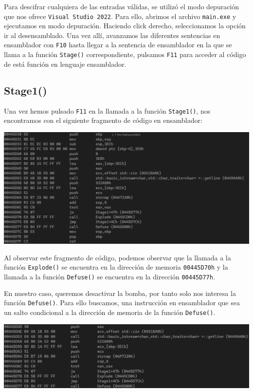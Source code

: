 \documentclass[11pt,a4paper]{article}
\begin{document}
Para descifrar cualquiera de las entradas válidas, se utilizó el 
modo depuración que nos ofrece \texttt{Visual Studio 2022}. Para ello, abrimos el 
archivo \texttt{main.exe} y ejecutamos en modo depuración. Haciendo click derecho, 
seleccionamos la opción ir al desensamblado. Una vez allí, avanzamos las diferentes sentencias 
en ensamblador con \texttt{F10} hasta llegar a la sentencia de ensamblador en la que 
se llama a la función \texttt{Stage()} correspondiente, pulsamos \texttt{F11} para acceder 
al código de está función en lenguaje ensamblador.

\subsection{Stage1()}
Una vez hemos pulsado \texttt{F11} en la llamada a la función \texttt{Stage1()}, 
nos encontramos con el siguiente fragmento de código en ensamblador:
\begin{center}
\includegraphics[width=\textwidth]{Stage1/Stage1.png}
\end{center}

Al observar este fragmento de código, podemos observar que la llamada a la función 
\texttt{Explode()} se encuentra en la dirección de memoria \texttt{00445D70h} y la llamada 
a la función \texttt{Defuse()} se encuentra en la dirección \texttt{00445D77h}. 
\vspace{2ex}

En nuestro caso, queremos desactivar la bomba, por tanto solo nos interesa la función 
\texttt{Defuse()}. Para ello buscamos, una instrucción en ensamblador que sea un salto condicional 
a la dirección de memoria de la función \texttt{Defuse()}.


\begin{center}
  \includegraphics[width=\textwidth]{Stage1/SaltoStage1.png}
\end{center}
\end{document}
